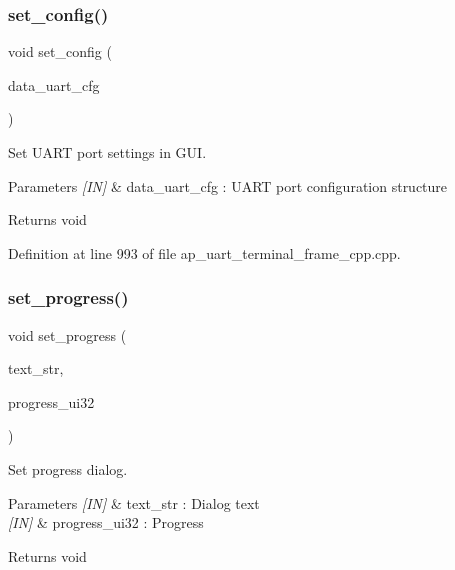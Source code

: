 \mbox{\label{group___u_a_r_t__terminal_ga658464cfaff2e47e321ffa1f5245f350}} 
\subsubsection{set\_config()}
{\footnotesize\ttfamily void set\+\_\+config (\begin{DoxyParamCaption}\item[{\textbf{ uart\+\_\+cfg\+\_\+t}}]{data\+\_\+uart\+\_\+cfg }\end{DoxyParamCaption})}



Set U\+A\+RT port settings in G\+UI. 


\begin{DoxyParams}{Parameters}
{\em \mbox{[}\+I\+N\mbox{]}} & data\+\_\+uart\+\_\+cfg \+: U\+A\+RT port configuration structure \\
\hline
\end{DoxyParams}
\begin{DoxyReturn}{Returns}
void 
\end{DoxyReturn}


Definition at line 993 of file ap\+\_\+uart\+\_\+terminal\+\_\+frame\+\_\+cpp.\+cpp.

\mbox{\label{group___u_a_r_t__terminal_gaffd459f0ab93e19fd565f8194b5ef3a9}} 
\subsubsection{set\_progress()}
{\footnotesize\ttfamily void set\+\_\+progress (\begin{DoxyParamCaption}\item[{wx\+String}]{text\+\_\+str,  }\item[{uint32\+\_\+t}]{progress\+\_\+ui32 }\end{DoxyParamCaption})}



Set progress dialog. 


\begin{DoxyParams}{Parameters}
{\em \mbox{[}\+I\+N\mbox{]}} & text\+\_\+str \+: Dialog text \\
\hline
{\em \mbox{[}\+I\+N\mbox{]}} & progress\+\_\+ui32 \+: Progress \\
\hline
\end{DoxyParams}
\begin{DoxyReturn}{Returns}
void 
\end{DoxyReturn}


